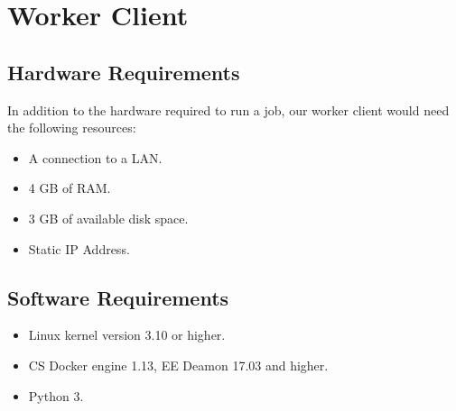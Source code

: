   \section{Worker Client}
    \subsection{Hardware Requirements}
      In addition to the hardware required to run a job, our worker client would need the following resources:
    \begin{itemize}
      \item A connection to a LAN.
      \item 4 GB of RAM.
      \item 3 GB of available disk space.
      \item Static IP Address.
    \end{itemize}
    \subsection{Software Requirements}
    \begin{itemize}
      \item Linux kernel version 3.10 or higher.
      \item CS Docker engine 1.13, EE Deamon 17.03 and higher.
      \item Python 3.
    \end{itemize}

